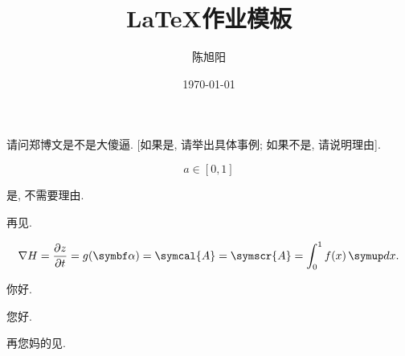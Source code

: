 \documentclass[12pt, chinese, lineno, watermark]{assignment}
\title{\LaTeX 作业模板}
\author{陈旭阳}
\date{\today}
\institute{同济大学数学科学学院}
\begin{document}
    \maketitle

    \begin{problem}
        请问郑博文是不是大傻逼. [如果是, 请举出具体事例; 如果不是, 请说明理由].

        \begin{equation}
            a\in[0, 1]
        \end{equation}
    \end{problem}

    \begin{solution}
        是, 不需要理由.
    \end{solution}

    再见.

    \begin{equation}
        \nabla{H}=\frac{\partial{z}}{\partial{t}}=g(\vect{\alpha}) = \symcal{A} = \symscr{A} = \int_{0}^{1}f(x)\diff x.
    \end{equation}

    你好.

    \clearpage

    您好.

    再您妈的见.
\end{document}
